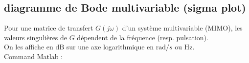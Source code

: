 \documentclass[document.tex]{subfiles}
\begin{document}
\subsection{diagramme de Bode multivariable (sigma plot)}

Pour une matrice de transfert $G(j\omega)$ d'un système multivariable (MIMO), les valeurs singulières de $G$ dépendent de la fréquence (resp. pulsation).\\

On les affiche en $\text{dB}$ sur une axe logarithmique en $\text{rad}/s$ ou $\text{Hz}$.\\

Command Matlab : 
\end{document}
